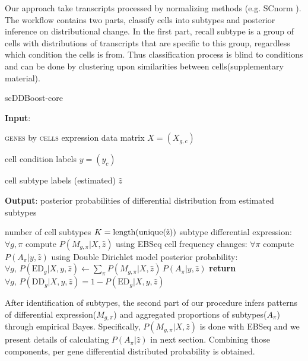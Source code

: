 \documentclass[11pt]{amsart}
\begin{document}
Our approach take transcripts processed by normalizing methods (e.g. SCnorm \cite{ref:Rhonda}). 
The workflow contains two parts, classify cells into subtypes and posterior inference on distributional change. In the first part, recall subtype is a group of cells with distributions of transcripts that are specific to this group, regardless which condition the cells is from. Thus classification process is blind to conditions and can be done by clustering upon similarities between cells(supplementary material). 
\begin{algorithm}
\caption{scDDBoost-core}\label{alg:scDDcore}
\raggedright\hspace*{\algorithmicindent} \textbf{Input}: \begin{list}{}{}
 \item \textsc{genes} by \textsc{cells} expression data matrix $X=(X_{g,c})$
 \item  cell condition labels $y=(y_c)$ 
 \item  cell subtype labels (estimated)  $\hat z$
 \end{list}
\hspace*{\algorithmicindent} 
\textbf{Output}:  posterior probabilities of differential distribution from estimated subtypes
\begin{algorithmic}[1]
 \item  number of cell subtypes $K = \rm{length}( \rm{unique}( \hat z ) )$  
\State subtype differential expression: $\forall g,\pi$ compute  $P(M_{g,\pi} | X, \hat z)$ using EBSeq\cite{ref:Leng}
\State cell frequency changes: $\forall \pi$ compute  $P(A_\pi | y, \hat z)$ using Double Dirichlet model 
\State posterior probability: $\forall g,  \, P(\text{ED}_g | X, y, \hat z)\gets \underset{\pi}{\sum}P(M_{g,\pi} | X, \hat z) \,
 P(A_\pi | y, \hat z)$
\State \textbf{return} $\forall g, \, P(\text{DD}_g |X, y, \hat z)=1-P(\text{ED}_g| X,y, \hat z)$
\EndProcedure
\end{algorithmic}
\end{algorithm}


After identification of subtypes, the second part of our procedure infers patterns of differential expression($M_{g,\pi}$) and aggregated proportions of subtypes($A_\pi$)
through empirical Bayes. Specifically, $P(M_{g,\pi} | X, \hat{z})$ is done with EBSeq\cite{ref:Leng} and we present details of calculating $P(A_\pi | \hat{z})$ in next section. Combining those components, per gene differential distributed probability is obtained.
\end{document}
